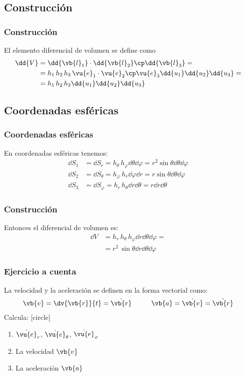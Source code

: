 \subsection{Construcción}
\begin{frame}
\frametitle{Construcción}
El elemento diferencial de volumen se define como
\begin{align*}
\dd{V} &= \dd{\vb{l}_{1}} \cdot \dd{\vb{l}_{2}} \cp \dd{\vb{l}_{3}} = \\
&= h_{1} \, h_{2} \, h_{3} \, \vu{e}_{1} \cdot \vu{e}_{2} \cp \vu{e}_{3} \dd{u_{1}} \dd{u_{2}} \dd{u_{3}} = \\
&= h_{1} \, h_{2} \, h_{3} \dd{u_{1}} \dd{u_{2}} \dd{u_{3}}
\end{align*}
\end{frame}
\subsection*{Coordenadas esféricas}
\begin{frame}
\frametitle{Coordenadas esféricas}
En coordenadas esféricas tenemos:
\begin{align*}
\dd{S_{1}} &= \dd{S_{r}} = h_{\theta} \, h_{\varphi} \dd{\theta} \dd{\varphi} = r^{2} \sin \theta \dd{\theta} \dd{\varphi} \\[0.5em]
\dd{S_{2}} &= \dd{S_{\theta}} = h_{\varphi} \, h_{r} \dd{\varphi} \dd{r} = r \sin \theta \dd{\theta} \dd{\varphi} \\[0.5em]
\dd{S_{3}} &= \dd{S_{\varphi}} = h_{r} \, h_{\theta} \dd{r} \dd{\theta} = r \dd{r} \dd{\theta}
\end{align*}
\end{frame}
\begin{frame}
\frametitle{Construcción}
Entonces el diferencial de volumen es:
\begin{align*}
\dd{V} &= h_{r} \, h_{\theta} \, h_{\varphi} \dd{r} \dd{\theta} \dd{\varphi} = \\[0.5em]
&= r^{2} \, \sin \theta \dd{r} \dd{\theta} \dd{\varphi}
\end{align*}
\end{frame}
\begin{frame}
\frametitle{Ejercicio a cuenta}
La velocidad y la aceleración se definen en la forma vectorial como:
\begin{align*}
\vb{v} = \dv{\vb{r}}{t} = \dot{\vb{r}} \hspace{1cm} \vb{a} = \dot{\vb{v}} = \ddot{\vb{r}}
\end{align*}
Calcula:
[circle]
\begin{enumerate}
\item $\dot{\vu{e}}_{r}$, $\dot{\vu{e}}_{\theta}$, $\dot{\vu{e}}_{\varphi}$ 
\item La velocidad $\vb{v}$
\item La aceleración $\vb{a}$
\end{enumerate}
\end{frame}
